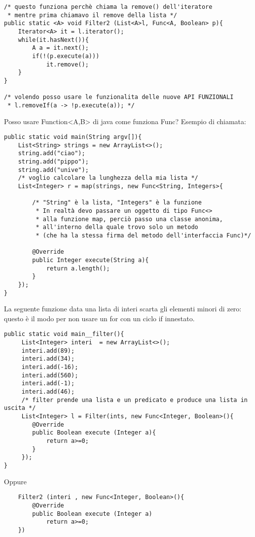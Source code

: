 \begin{lstlisting}
/* questo funziona perchè chiama la remove() dell'iteratore
 * mentre prima chiamavo il remove della lista */
public static <A> void Filter2 (List<A>l, Func<A, Boolean> p){
	Iterator<A> it = l.iterator();
	while(it.hasNext()){
		A a = it.next();
		if(!(p.execute(a)))
			it.remove();
	}
}

/* volendo posso usare le funzionalita delle nuove API FUNZIONALI
 * l.removeIf(a -> !p.execute(a)); */
\end{lstlisting}

\noindent Posso usare Function<A,B> di java come funziona Func? \newline
Esempio di chiamata:

\begin{lstlisting}
public static void main(String argv[]){
	List<String> strings = new ArrayList<>();
	string.add("ciao");
	string.add("pippo");
	string.add("unive");
	/* voglio calcolare la lunghezza della mia lista */
	List<Integer> r = map(strings, new Func<String, Integers>{ 
	
		/* "String" è la lista, "Integers" è la funzione
         * In realtà devo passare un oggetto di tipo Func<>
         * alla funzione map, perciò passo una classe anonima,
         * all'interno della quale trovo solo un metodo
         * (che ha la stessa firma del metodo dell'interfaccia Func)*/
         
		@Override 
		public Integer execute(String a){
			return a.length();
		}	
	});
}
\end{lstlisting}


\noindent La seguente funzione data una lista di interi scarta gli elementi minori di zero: questo è il modo per non usare un for con un ciclo if innestato.

\begin{lstlisting}
public static void main__filter(){
	 List<Integer> interi  = new ArrayList<>();
	 interi.add(89);
	 interi.add(34);
	 interi.add(-16);
	 interi.add(560);
	 interi.add(-1);
	 interi.add(46);
	 /* filter prende una lista e un predicato e produce una lista in uscita */
	 List<Integer> l = Filter(ints, new Func<Integer, Boolean>(){
	 	@Override
	 	public Boolean execute (Integer a){
	 		return a>=0;
	 	}
	 });
}
\end{lstlisting}

\noindent Oppure 

\begin{lstlisting}
	Filter2 (interi , new Func<Integer, Boolean>(){
		@Override
		public Boolean execute (Integer a)
			return a>=0;
	})
\end{lstlisting}


